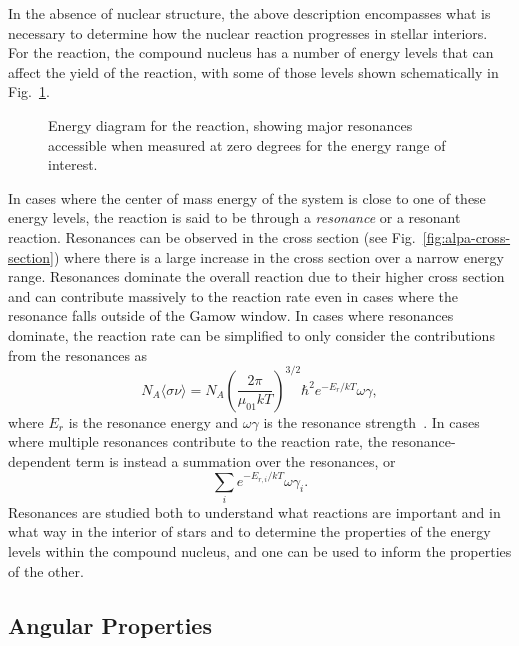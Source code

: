In the absence of nuclear structure, the above description encompasses
what is necessary to determine how the nuclear reaction progresses in
stellar interiors. For the \alpa{} reaction, the compound nucleus
 has a number of energy levels that can affect the yield
of the reaction, with some of those levels shown schematically in
Fig.~\ref{fig:alpa}.

\begin{figure}[t]
    \begin{center}
        \caption[Energy diagram for the \alpa{} reaction]{Energy diagram
            for the \alpa{} reaction, showing major resonances
            accessible when measured at zero degrees for the energy
            range of interest.}
        \label{fig:alpa}
    \end{center}
\end{figure}

In cases where the center of mass energy of the system is close to one
of these energy levels, the reaction is said to be through a
\emph{resonance} or a resonant reaction. Resonances can be observed in
the cross section (see Fig.~\ref{fig:alpa-cross-section}) where there is
a large increase in the cross section over a narrow energy range.
Resonances dominate the overall reaction due to their higher cross
section and can contribute massively to the reaction rate even in cases
where the resonance falls outside of the Gamow window. In cases where
resonances dominate, the reaction rate can be simplified to only
consider the contributions from the resonances as
\[
    N_A\langle\sigma\nu\rangle = N_A\left(\frac{2\pi}{\mu_{01}kT}\right)^{3/2}
        \hbar^2e^{-E_r/kT}\omega\gamma,
\]
where $E_r$ is the resonance energy and $\omega\gamma$ is the resonance
strength~\cite{Iliadis}. In cases where multiple resonances contribute
to the reaction rate, the resonance-dependent term is instead a
summation over the resonances, or
\[
    \sum_i e^{-E_{r,i}/kT}\omega\gamma_i.
\]
Resonances are studied both to understand what reactions are important
and in what way in the interior of stars and to determine the properties
of the energy levels within the compound nucleus, and one can be used to
inform the properties of the other.

\subsection{Angular Properties}

